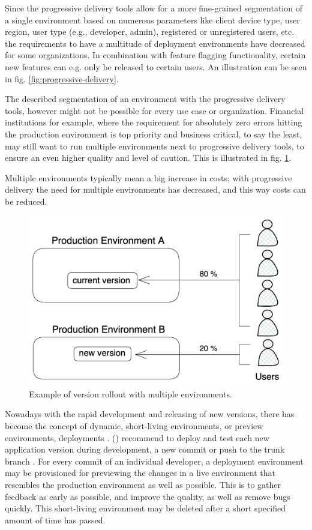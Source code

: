 Since the progressive delivery tools allow for a more
fine-grained segmentation
of a single environment based on numerous parameters like
client device type, user region, user type (e.g., developer, admin),
registered or unregistered users, etc.
the requirements to have a multitude of deployment environments
have decreased for some organizations.
In combination with feature flagging functionality,
certain new features can e.g. only be released to certain users.
An illustration can be seen in fig. \ref{fig:progressive-delivery}.

The described segmentation of an environment with the progressive delivery
tools, however might not be possible for every use case or organization.
Financial institutions for example, where the requirement for absolutely zero
errors hitting the production environment is top priority and business critical,
to say the least,
may still want to run multiple environments next to progressive delivery tools,
to ensure an even higher quality and level of caution.
This is illustrated in fig. \ref{fig:deploy-multiple-envs}.

Multiple environments typically mean a big increase in costs;
with progressive delivery the need for multiple environments has decreased,
and this way costs can be reduced.

\begin{figure}[h]
	\centering
	\includegraphics[width=0.75\linewidth]{assets/deploy-multiple-envs.png}
	\caption{Example of version rollout with multiple environments.
	}
	\label{fig:deploy-multiple-envs}	
\end{figure}

Nowadays with the rapid development and releasing of new versions,
there has become the concept of dynamic, short-living environments,
or preview environments, deployments
\autocite{gitopsCloudnativeCDInnoq}.
\citeauthor{hightower2017kubernetes} (\citeyear{hightower2017kubernetes})
recommend to deploy and test each new application version during development,
a new commit or push to the trunk branch
\autocite{hightower2017kubernetes}.
%
For every commit of an individual developer,
a deployment environment may be provisioned for previewing the changes
in a live environment that resembles the production environment as well as possible.
This is to gather feedback as early as possible,
and improve the quality, as well as remove bugs quickly.
This short-living environment may be deleted after a short specified
amount of time has passed.







